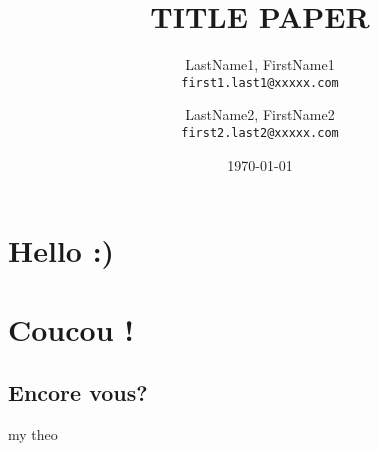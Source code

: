 \documentclass[10pt]{article}
\title{TITLE PAPER}
\author{
    LastName1, FirstName1\\
    \texttt{first1.last1@xxxxx.com}
    \and
    LastName2, FirstName2\\
    \texttt{first2.last2@xxxxx.com}
}
\date{\today}
\begin{document}
    \maketitle
    \begin{abstract}
    \end{abstract}



    \section{Hello :)}


    \section{Coucou !}

    \subsection{Encore vous?}

    \lipsum


    \begin{definition}[my def]
        \lipsum
    \end{definition}


    \begin{theoreme}[label = thrm:X]{my theo}
        \lipsum
    \end{theoreme}

    \begin{demo}{}{}
        \lipsum
    \end{demo}

    \begin{ajoutationV}{}{}
        \lipsum
    \end{ajoutationV}



    \printbibliography[category=cited]%
    \printbibliography[title={Further Reading},notcategory=cited]
    \nocite{*}
\end{document}
